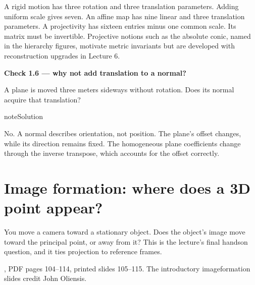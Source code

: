 \documentclass[letterpaper,11pt,english,openany,oneside]{jupyterBook}
\begin{document}
\sphinxAtStartPar
A rigid motion has three rotation and three translation parameters. Adding uniform scale gives seven. An affine map has nine linear and three translation parameters. A projectivity has sixteen entries minus one common scale. Its matrix must be invertible. Projective notions such as the absolute conic, named in the hierarchy figures, motivate metric invariants but are developed with reconstruction upgrades in Lecture 6.

\begin{TextbookBox}
\textbf{Check 1.6 — why not add translation to a normal?}\par\smallskip

\sphinxAtStartPar
A plane is moved three meters sideways without rotation. Does its normal acquire that translation?

\end{TextbookBox}

\begin{sphinxadmonition}{note}{Solution}

\sphinxAtStartPar
No. A normal describes orientation, not position. The plane’s offset changes, while its direction remains fixed. The homogeneous plane coefficients change through the inverse transpose, which accounts for the offset correctly.
\end{sphinxadmonition}

\ignorespaces
{}\ignorespaces
{}\ignorespaces
{}\ignorespaces
\sphinxstepscope


\section{Image formation: where does a 3D point appear?}
\label{\detokenize{lectures/lecture01/cameras:image-formation-where-does-a-3d-point-appear}}\label{\detokenize{lectures/lecture01/cameras:lec01-cameras}}\label{\detokenize{lectures/lecture01/cameras::doc}}
\sphinxAtStartPar
You move a camera toward a stationary object. Does the object’s image move toward the principal point, or away from it? This is the lecture’s final hands\sphinxhyphen{}on question, and it ties projection to reference frames.

\sphinxAtStartPar
{} , PDF pages 104–114, printed slides 105–115. The introductory image\sphinxhyphen{}formation slides credit John Oliensis.
\end{document}
